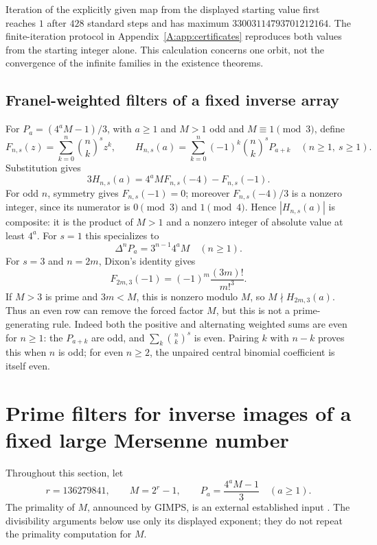\documentclass[11pt,a4paper]{article}
\theoremstyle{definition}
\theoremstyle{remark}
\numberwithin{equation}{section}
\begin{document}
Iteration of the explicitly given map from the displayed starting
value first reaches $1$ after $428$ standard steps and has maximum
$33003114793701212164$. The finite-iteration protocol in
Appendix~\ref{A:app:certificates} reproduces both values from the starting
integer alone. This calculation concerns one orbit, not the convergence
of the infinite families in the existence theorems.

\subsection{Franel-weighted filters of a fixed inverse array}
For $P_a=(4^aM-1)/3$, with $a\ge1$ and $M>1$ odd and
$M\equiv1\pmod3$, define
\[
 F_{n,s}(z)=\sum_{k=0}^n\binom nk^s z^k,\qquad
 H_{n,s}(a)=\sum_{k=0}^n(-1)^k\binom nk^sP_{a+k}
 \quad(n\ge1,\ s\ge1).
\]
Substitution gives
\[
 3H_{n,s}(a)=4^aM F_{n,s}(-4)-F_{n,s}(-1).
\]
For odd $n$, symmetry gives $F_{n,s}(-1)=0$; moreover
$F_{n,s}(-4)/3$ is a nonzero integer, since its numerator is $0\pmod3$
and $1\pmod4$. Hence $|H_{n,s}(a)|$ is composite: it is the product
of $M>1$ and a nonzero integer of absolute value at least $4^a$.
For $s=1$ this specializes to
\[
 \Delta^nP_a=3^{n-1}4^aM\quad(n\ge1).
\]
For $s=3$ and $n=2m$, Dixon's identity \cite{R012} gives
\[
 F_{2m,3}(-1)=(-1)^m\frac{(3m)!}{m!^3}.
\]
If $M>3$ is prime and $3m<M$, this is nonzero modulo $M$, so
$M\nmid H_{2m,3}(a)$. Thus an even row can remove the forced factor
$M$, but this is not a prime-generating rule. Indeed both the positive
and alternating weighted sums are even for $n\ge1$: the $P_{a+k}$ are
odd, and $\sum_k\binom nk^s$ is even. Pairing $k$ with $n-k$ proves
this when $n$ is odd; for even $n\ge2$, the unpaired central binomial
coefficient is itself even.


\section{Prime filters for inverse images of a fixed large Mersenne number}
\label{A:sec:filters}
Throughout this section, let
\[
 r=136279841,\qquad M=2^r-1,\qquad P_a=\frac{4^aM-1}{3}\quad(a\ge1).
\]
The primality of $M$, announced by GIMPS, is an external established input
\cite{R017}. The divisibility arguments below use only its displayed
exponent; they do not repeat the primality computation for $M$.
\end{document}
